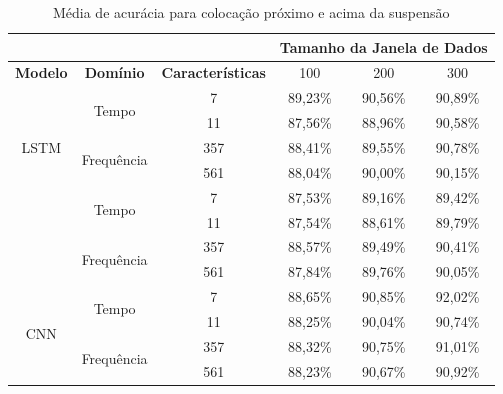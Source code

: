 \begin{table}[h!]
\scriptsize
\centering
\caption{Média de acurácia para colocação próximo e acima da suspensão}
\label{table:above_suspension_results_tipo_superficie_2}
\begin{tabular}{cccccc}
\cmidrule(l){4-6}
 & \multicolumn{1}{l}{\textbf{}} & \multicolumn{1}{l}{} & \multicolumn{3}{c}{\textbf{Tamanho da Janela de Dados}} \\ \midrule
\textbf{Modelo} & \textbf{Domínio} & \textbf{Características} & \multicolumn{1}{c}{100} & \multicolumn{1}{c}{200} & \multicolumn{1}{c}{300} \\ \midrule
\multirow{5}{*}{LSTM} & \multirow{2}{*}{Tempo} & 7 & 89,23\% & 90,56\% & \cellcolor[HTML]{34FF34}90,89\% \\ \cmidrule(l){3-6} 
 &  & 11 & 87,56\% & 88,96\% & 90,58\% \\ \cmidrule(l){2-6} 
 & \multirow{2}{*}{Frequência} & 357 & 88,41\% & 89,55\% & 90,78\% \\ \cmidrule(l){3-6} 
 &  & 561 & 88,04\% & 90,00\% & 90,15\% \\ \midrule
\multirow{5}{*}{GRU} & \multirow{2}{*}{Tempo} & 7 & 87,53\% & 89,16\% & 89,42\% \\ \cmidrule(l){3-6} 
 &  & 11 & 87,54\% & 88,61\% & 89,79\% \\ \cmidrule(l){2-6} 
 & \multirow{2}{*}{Frequência} & 357 & 88,57\% & 89,49\% & \cellcolor[HTML]{34FF34}90,41\% \\ \cmidrule(l){3-6} 
 &  & 561 & 87,84\% & 89,76\% & 90,05\% \\ \midrule
\multirow{5}{*}{CNN} & \multirow{2}{*}{Tempo} & 7 & 88,65\% & 90,85\% & \cellcolor[HTML]{34FF34}92,02\% \\ \cmidrule(l){3-6} 
 &  & 11 & 88,25\% & 90,04\% & 90,74\% \\ \cmidrule(l){2-6} 
 & \multirow{2}{*}{Frequência} & 357 & 88,32\% & 90,75\% & 91,01\% \\ \cmidrule(l){3-6} 
 &  & 561 & 88,23\% & 90,67\% & 90,92\% \\ \bottomrule
\end{tabular}
\end{table}

